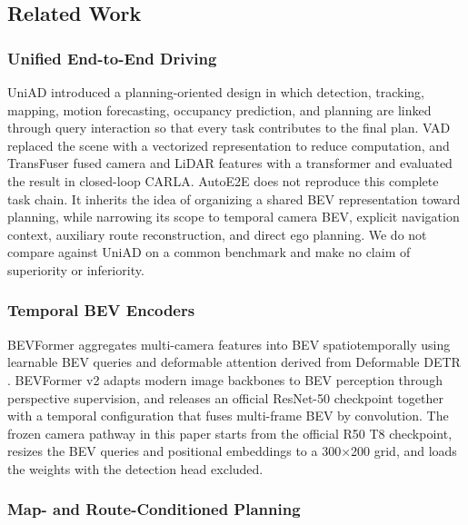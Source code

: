 \documentclass[
  english,
  10pt,
]{article}
\begin{document}
\subsection{Related Work}\label{related-work}

\subsubsection{Unified End-to-End
Driving}\label{unified-end-to-end-driving}

UniAD \hyperref[ref-uniad]{}introduced a planning-oriented design in
which detection, tracking, mapping, motion forecasting, occupancy
prediction, and planning are linked through query interaction so that
every task contributes to the final plan. VAD
\hyperref[ref-vad]{}replaced the scene with a vectorized representation
to reduce computation, and TransFuser
\hyperref[ref-transfuser]{}\hyperref[ref-transfuser-cvpr]{}fused camera
and LiDAR features with a transformer and evaluated the result in
closed-loop CARLA. AutoE2E does not reproduce this complete task chain.
It inherits the idea of organizing a shared BEV representation toward
planning, while narrowing its scope to temporal camera BEV, explicit
navigation context, auxiliary route reconstruction, and direct ego
planning. We do not compare against UniAD on a common benchmark and make
no claim of superiority or inferiority.

\subsubsection{Temporal BEV Encoders}\label{temporal-bev-encoders}

BEVFormer \hyperref[ref-bevformer]{}aggregates multi-camera features
into BEV spatiotemporally using learnable BEV queries and deformable
attention derived from Deformable DETR \hyperref[ref-deformable]{}.
BEVFormer v2 \hyperref[ref-bevformerv2]{}adapts modern image backbones
to BEV perception through perspective supervision, and releases an
official ResNet-50 checkpoint together with a temporal configuration
that fuses multi-frame BEV by convolution. The frozen camera pathway in
this paper starts from the official R50 T8 checkpoint, resizes the BEV
queries and positional embeddings to a 300×200 grid, and loads the
weights with the detection head excluded.

\subsubsection{Map- and Route-Conditioned
Planning}\label{map--and-route-conditioned-planning}
\end{document}
